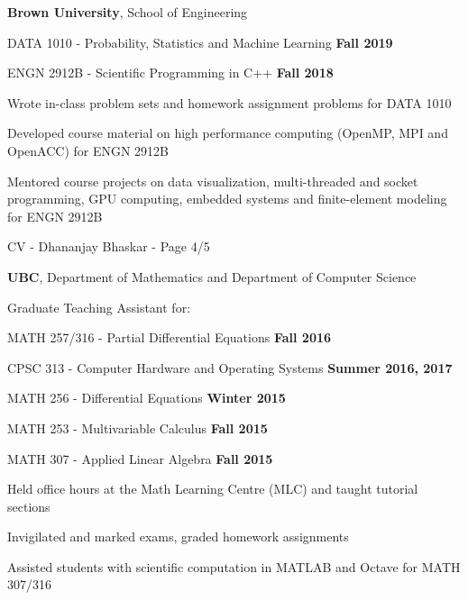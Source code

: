 \documentclass[margin,line]{res}
\newenvironment{list1}{
  \begin{list}{\ding{113}}{
      \setlength{\itemsep}{0in}
      \setlength{\parsep}{0in} \setlength{\parskip}{0in}
      \setlength{\topsep}{0in} \setlength{\partopsep}{0in}
      \setlength{\leftmargin}{0.17in}}}{\end{list}}
\newenvironment{list3}{
  \begin{list}{\textopenbullet}{
      \setlength{\itemsep}{0in}
      \setlength{\parsep}{0in} \setlength{\parskip}{0in}
      \setlength{\topsep}{0in} \setlength{\partopsep}{0in}
      \setlength{\leftmargin}{0.1in}}}{\end{list}}
\begin{document}
\begin{resume}
{\bf Brown University}, School of Engineering\\
\vspace*{-.2cm}
\begin{list1}
\setlength\itemsep{0.25em}
\item[] DATA 1010 - Probability, Statistics and Machine Learning \hfill {\bf Fall 2019}
\item[] ENGN 2912B - Scientific Programming in C++ \hfill {\bf Fall 2018}\\
\begin{list3}
\vspace*{-.1cm}
\setlength\itemsep{0.25em}
\item Wrote in-class problem sets and homework assignment problems for DATA 1010
\item Developed course material on high performance computing (OpenMP, MPI and OpenACC) for ENGN 2912B
\item Mentored course projects on data visualization, multi-threaded and socket programming, GPU computing, embedded systems and finite-element modeling for ENGN 2912B
\end{list3}
\end{list1}

\newpage
\begin{flushright}
CV - Dhananjay Bhaskar - Page 4/5
\end{flushright}
\vspace*{.2cm}

{\bf UBC}, Department of Mathematics and Department of Computer Science\\
\vspace*{-.2cm}
\begin{list1}
\setlength\itemsep{0.25em}
\item[] Graduate Teaching Assistant for:\\[-0.1cm]
\item[] MATH 257/316 - Partial Differential Equations \hfill {\bf Fall 2016}
\item[] CPSC 313 - Computer Hardware and Operating Systems \hfill {\bf Summer 2016, 2017}
\item[] MATH 256 - Differential Equations \hfill {\bf Winter 2015}
\item[] MATH 253 - Multivariable Calculus \hfill {\bf Fall 2015}
\item[] MATH 307 - Applied Linear Algebra \hfill {\bf Fall 2015}\\
\begin{list3}
\vspace*{-.1cm}
\setlength\itemsep{0.25em}
\item Held office hours at the Math Learning Centre (MLC) and taught tutorial sections
\item Invigilated and marked exams, graded homework assignments
\item Assisted students with scientific computation in MATLAB and Octave for MATH 307/316
\end{list3}
\end{list1}
\vspace*{.1cm}


\end{resume}
\end{document}
